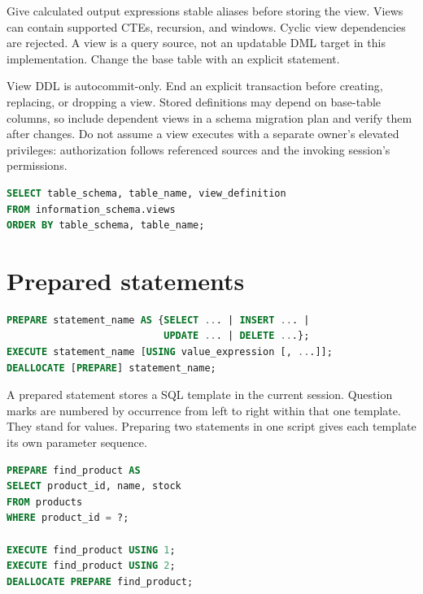 Give calculated output expressions stable aliases before storing the view. Views can contain supported CTEs, recursion, and windows. Cyclic view dependencies are rejected. A view is a query source, not an updatable DML target in this implementation. Change the base table with an explicit statement.

View DDL is autocommit-only. End an explicit transaction before creating, replacing, or dropping a view. Stored definitions may depend on base-table columns, so include dependent views in a schema migration plan and verify them after changes. Do not assume a view executes with a separate owner's elevated privileges: authorization follows referenced sources and the invoking session's permissions.

\begin{lstlisting}[language=SQL]
SELECT table_schema, table_name, view_definition
FROM information_schema.views
ORDER BY table_schema, table_name;
\end{lstlisting}


\section{Prepared statements}
\label{sql:prepared}

\begin{lstlisting}[language=SQL]
PREPARE statement_name AS {SELECT ... | INSERT ... |
                           UPDATE ... | DELETE ...};
EXECUTE statement_name [USING value_expression [, ...]];
DEALLOCATE [PREPARE] statement_name;
\end{lstlisting}

A prepared statement stores a SQL template in the current session. Question marks are numbered by occurrence from left to right within that one template. They stand for values. Preparing two statements in one script gives each template its own parameter sequence.

\begin{lstlisting}[language=SQL]
PREPARE find_product AS
SELECT product_id, name, stock
FROM products
WHERE product_id = ?;

EXECUTE find_product USING 1;
EXECUTE find_product USING 2;
DEALLOCATE PREPARE find_product;
\end{lstlisting}


